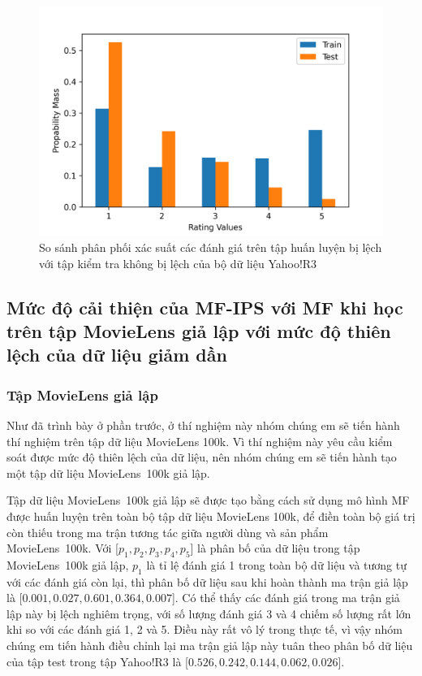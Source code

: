 \begin{figure}[h]
    \centering
    \includegraphics[width=\textwidth]{images/Chapter4/Diff_yahoo.png}
    \caption{So sánh phân phối xác suất các đánh giá trên tập huấn luyện bị lệch với tập kiểm tra không bị lệch của bộ dữ liệu Yahoo!R3}
    \label{fig:4_2_yahoo}
\end{figure}









\subsection{Mức độ cải thiện của MF-IPS với MF khi học trên tập MovieLens giả lập với mức độ thiên lệch của dữ liệu giảm dần}
\subsubsection{Tập MovieLens giả lập}
\label{subsubsection:MovieLens}
Như đã trình bày ở phần trước, ở thí nghiệm này nhóm chúng em sẽ tiến hành thí nghiệm trên tập dữ liệu MovieLens 100k. Vì thí nghiệm này yêu cầu kiểm soát được mức độ thiên lệch của dữ liệu, nên nhóm chúng em sẽ tiến hành tạo một tập dữ liệu MovieLens~100k giả lập. 

Tập dữ liệu MovieLens~100k giả lập sẽ được tạo bằng cách sử dụng mô hình MF được huấn luyện trên toàn bộ tập dữ liệu MovieLens 100k, để điền toàn bộ giá trị còn thiếu trong ma trận tương tác giữa người dùng và sản phẩm MovieLens~100k. Với [$p_1, p_2, p_3, p_4, p_5$] là phân bố của dữ liệu trong tập MovieLens~100k giả lập, $p_1$ là tỉ lệ đánh giá 1 trong toàn bộ dữ liệu và tương tự với các đánh giá còn lại, thì phân bố dữ liệu sau khi hoàn thành ma trận giả lập là [$0.001, 0.027, 0.601, 0.364, 0.007$]. Có thể thấy các đánh giá trong ma trận giả lập này bị lệch nghiêm trọng, với số lượng đánh giá 3 và 4 chiếm số lượng rất lớn khi so với các đánh giá 1, 2 và 5. Điều này rất vô lý trong thực tế, vì vậy nhóm chúng em tiến hành điều chỉnh lại ma trận giả lập này tuân theo phân bố dữ liệu của tập test trong tập Yahoo!R3 là [$0.526, 0.242, 0.144, 0.062, 0.026$].


